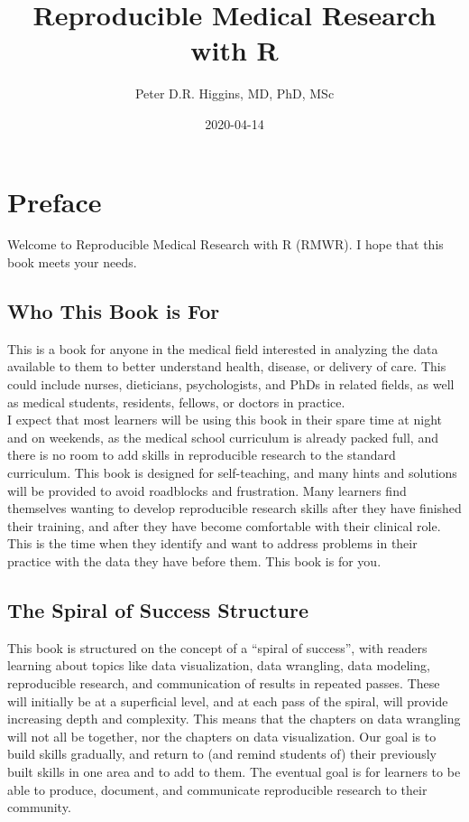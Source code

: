 \documentclass[]{book}
\title{Reproducible Medical Research with R}
\author{Peter D.R. Higgins, MD, PhD, MSc}
\date{2020-04-14}
\begin{document}
\maketitle

{
\setcounter{tocdepth}{1}
\tableofcontents
}
\hypertarget{preface}{%
\chapter{Preface}\label{preface}}

Welcome to Reproducible Medical Research with R (RMWR). I hope that this book meets your needs.

\hypertarget{who-this-book-is-for}{%
\section{Who This Book is For}\label{who-this-book-is-for}}

This is a book for anyone in the medical field interested in analyzing the data available to them to better understand health, disease, or delivery of care. This could include nurses, dieticians, psychologists, and PhDs in related fields, as well as medical students, residents, fellows, or doctors in practice.\\
I expect that most learners will be using this book in their spare time at night and on weekends, as the medical school curriculum is already packed full, and there is no room to add skills in reproducible research to the standard curriculum. This book is designed for self-teaching, and many hints and solutions will be provided to avoid roadblocks and frustration.
Many learners find themselves wanting to develop reproducible research skills after they have finished their training, and after they have become comfortable with their clinical role. This is the time when they identify and want to address problems in their practice with the data they have before them. This book is for you.

\hypertarget{the-spiral-of-success-structure}{%
\section{The Spiral of Success Structure}\label{the-spiral-of-success-structure}}

This book is structured on the concept of a ``spiral of success'', with readers learning about topics like data visualization, data wrangling, data modeling, reproducible research, and communication of results in repeated passes. These will initially be at a superficial level, and at each pass of the spiral, will provide increasing depth and complexity. This means that the chapters on data wrangling will not all be together, nor the chapters on data visualization. Our goal is to build skills gradually, and return to (and remind students of) their previously built skills in one area and to add to them. The eventual goal is for learners to be able to produce, document, and communicate reproducible research to their community.
\end{document}
